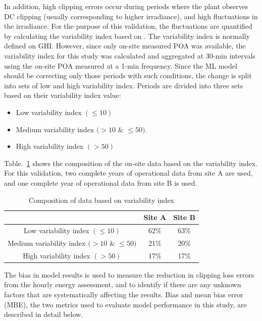 \documentclass[conference]{IEEEtran}
\begin{document}
In addition, high clipping errors occur during periods where the plant observes DC clipping (usually corresponding to higher irradiance), and high fluctuations in the irradiance. For the purpose of this validation, the fluctuations are quantified by calculating the variability index based on \cite{Stein}. The variability index is normally defined on GHI. However, since only on-site measured POA was available, the variability index for this study was calculated and aggregated at 30-min intervals using the on-site POA measured at a 1-min frequency. Since the ML model should be correcting only those periods with such conditions, the change is split into sets of low and high variability index. Periods are divided into three sets based on their variability index value:
\begin{itemize}
\item Low variability index  $(\leq10)$ 
\item Medium variability index  $(>10$ \& $\leq50)$. 
\item High variability index $(>50)$
\end{itemize}
Table.~\ref{var_index_breakdown} shows the composition of the on-site data based on the variability index. For this validation, two complete years of operational data from site A are used, and one complete year of operational data from site B is used.


\begin{table}[htbp]
\caption{Composition of data based on variability index}
\begin{center}
\begin{tabular}{ |c|c|c| } 
\hline
& Site A & Site B \\
\hline
Low variability index $(\leq10)$ & 62\% & 63\% \\
\hline
Medium variability index $(>10$ \& $\leq50)$ & 21\% & 20\% \\
\hline
High variability index $(>50)$ & 17\% & 17\% \\
\hline
\end{tabular}
\end{center}
\label{var_index_breakdown}
\end{table}


The bias in model results is used to measure the reduction in clipping loss errors from the hourly energy assessment, and to identify if there are any unknown factors that are systematically affecting the results. Bias and mean bias error (MBE), the two metrics used to evaluate model performance in this study, are described in detail below.
\end{document}
